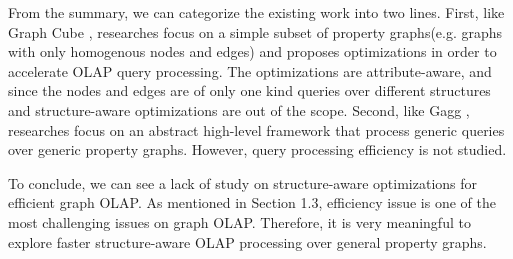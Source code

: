 From the summary, we can categorize the existing work into two lines. First, like Graph Cube \cite{DBLP:conf/sigmod/ZhaoLXH11}, researches focus on a simple subset of property graphs(e.g. graphs with only homogenous nodes and edges) and proposes optimizations in order to accelerate OLAP query processing. The optimizations are attribute-aware, and since the nodes and edges are of only one kind queries over different structures and structure-aware optimizations are out of the scope. Second, like Gagg \cite{DBLP:conf/esws/MaaliCD15}, researches focus on an abstract high-level framework that process generic queries over generic property graphs. However, query processing efficiency is not studied.

To conclude, we can see a lack of study on structure-aware optimizations for efficient graph OLAP. As mentioned in Section 1.3, efficiency issue is one of the most challenging issues on graph OLAP. Therefore, it is very meaningful to explore faster structure-aware OLAP processing over general property graphs.





